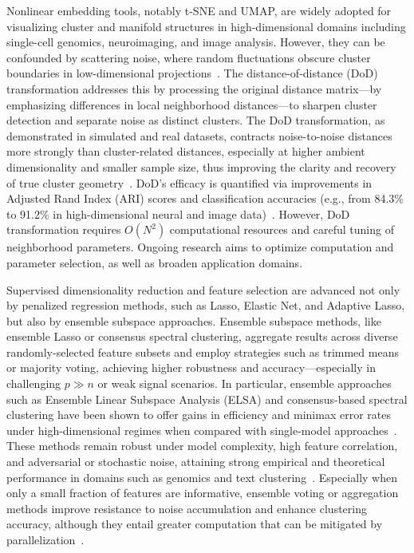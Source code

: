 \documentclass[sigconf]{acmart}
\begin{document}
Nonlinear embedding tools, notably t-SNE and UMAP, are widely adopted for visualizing cluster and manifold structures in high-dimensional domains including single-cell genomics, neuroimaging, and image analysis. However, they can be confounded by scattering noise, where random fluctuations obscure cluster boundaries in low-dimensional projections~\cite{ref99}. The distance-of-distance (DoD) transformation addresses this by processing the original distance matrix—by emphasizing differences in local neighborhood distances—to sharpen cluster detection and separate noise as distinct clusters. The DoD transformation, as demonstrated in simulated and real datasets, contracts noise-to-noise distances more strongly than cluster-related distances, especially at higher ambient dimensionality and smaller sample size, thus improving the clarity and recovery of true cluster geometry~\cite{ref101}. DoD's efficacy is quantified via improvements in Adjusted Rand Index (ARI) scores and classification accuracies (e.g., from 84.3\% to 91.2\% in high-dimensional neural and image data)~\cite{ref101}. However, DoD transformation requires $O(N^2)$ computational resources and careful tuning of neighborhood parameters. Ongoing research aims to optimize computation and parameter selection, as well as broaden application domains.

Supervised dimensionality reduction and feature selection are advanced not only by penalized regression methods, such as Lasso, Elastic Net, and Adaptive Lasso, but also by ensemble subspace approaches. Ensemble subspace methods, like ensemble Lasso or consensus spectral clustering, aggregate results across diverse randomly-selected feature subsets and employ strategies such as trimmed means or majority voting, achieving higher robustness and accuracy—especially in challenging $p \gg n$ or weak signal scenarios. In particular, ensemble approaches such as Ensemble Linear Subspace Analysis (ELSA) and consensus-based spectral clustering have been shown to offer gains in efficiency and minimax error rates under high-dimensional regimes when compared with single-model approaches~\cite{ref97,ref116}. These methods remain robust under model complexity, high feature correlation, and adversarial or stochastic noise, attaining strong empirical and theoretical performance in domains such as genomics and text clustering~\cite{ref116}. Especially when only a small fraction of features are informative, ensemble voting or aggregation methods improve resistance to noise accumulation and enhance clustering accuracy, although they entail greater computation that can be mitigated by parallelization~\cite{ref116}.
\end{document}
